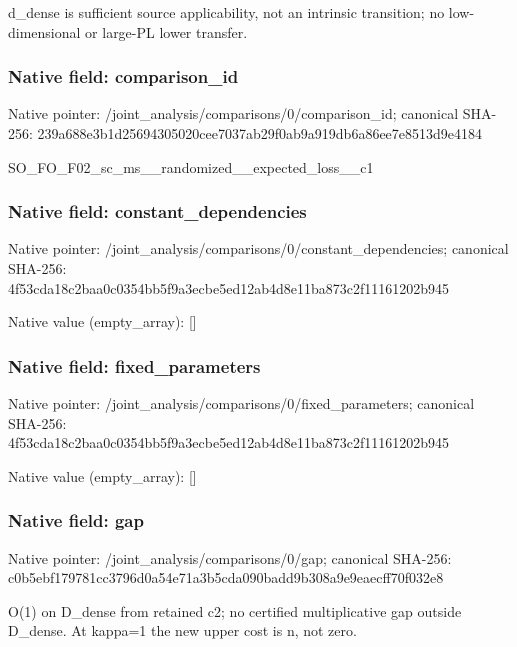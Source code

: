 \documentclass[10pt,a4paper]{article}
\begin{document}
\begingroup\raggedright\sloppy d\_\allowbreak{}dense is sufficient source applicability,\allowbreak{} not an intrinsic transition;\allowbreak{} no low-dimensional or large-PL lower transfer.\par\endgroup

\subsubsection{Native field: comparison\_\allowbreak{}id}
Native pointer: /joint\_\allowbreak{}analysis/comparisons/0/comparison\_\allowbreak{}id; canonical SHA-256: 239a688e3b1d25694305020cee7037ab29f0ab9a919db6a86ee7e8513d9e4184

\begingroup\raggedright\sloppy SO\_\allowbreak{}FO\_\allowbreak{}F02\_\allowbreak{}sc\_\allowbreak{}ms\_\allowbreak{}\_\allowbreak{}randomized\_\allowbreak{}\_\allowbreak{}expected\_\allowbreak{}loss\_\allowbreak{}\_\allowbreak{}c1\par\endgroup

\subsubsection{Native field: constant\_\allowbreak{}dependencies}
Native pointer: /joint\_\allowbreak{}analysis/comparisons/0/constant\_\allowbreak{}dependencies; canonical SHA-256: 4f53cda18c2baa0c0354bb5f9a3ecbe5ed12ab4d8e11ba873c2f11161202b945

Native value (empty\_\allowbreak{}array): []

\subsubsection{Native field: fixed\_\allowbreak{}parameters}
Native pointer: /joint\_\allowbreak{}analysis/comparisons/0/fixed\_\allowbreak{}parameters; canonical SHA-256: 4f53cda18c2baa0c0354bb5f9a3ecbe5ed12ab4d8e11ba873c2f11161202b945

Native value (empty\_\allowbreak{}array): []

\subsubsection{Native field: gap}
Native pointer: /joint\_\allowbreak{}analysis/comparisons/0/gap; canonical SHA-256: c0b5ebf179781cc3796d0a54e71a3b5cda090badd9b308a9e9eaecff70f032e8

\begingroup\raggedright\sloppy O(1) on D\_\allowbreak{}dense from retained c2;\allowbreak{} no certified multiplicative gap outside D\_\allowbreak{}dense. At kappa=\allowbreak{}1 the new upper cost is n,\allowbreak{} not zero.\par\endgroup
\end{document}
